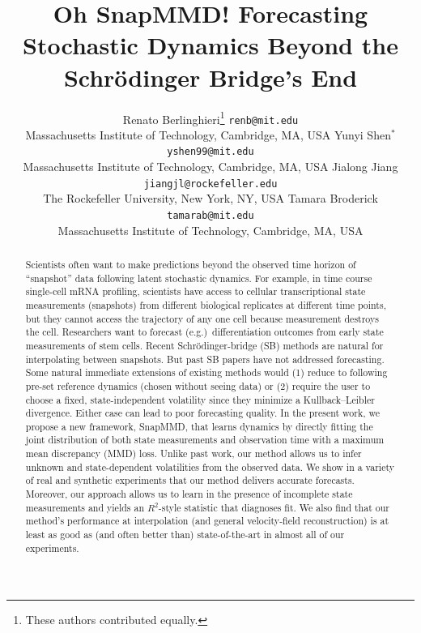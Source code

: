 \documentclass[twoside,11pt]{article}
\begin{document}
\title{Oh SnapMMD! Forecasting Stochastic Dynamics Beyond the Schr\"odinger Bridge's End}

\author{
  \name Renato Berlinghieri\thanks{These authors contributed equally.} \email \texttt{renb@mit.edu}\\
  \addr Massachusetts Institute of Technology, Cambridge, MA, USA
  \AND
  \name Yunyi Shen$^{*}$ \email \texttt{yshen99@mit.edu}\\
  \addr Massachusetts Institute of Technology, Cambridge, MA, USA
  \AND
  \name Jialong Jiang \email \texttt{jiangjl@rockefeller.edu}\\
  \addr The Rockefeller University, New York, NY, USA
  \AND
  \name Tamara Broderick \email \texttt{tamarab@mit.edu}\\
  \addr Massachusetts Institute of Technology, Cambridge, MA, USA
}

\editor{}

\maketitle

\begin{abstract}%
Scientists often want to make predictions beyond the observed time horizon of “snapshot” data following latent stochastic dynamics. For example, in time course single-cell mRNA profiling, scientists have access to cellular transcriptional state measurements (snapshots) from different biological replicates at different time points, but they cannot access the trajectory of any one cell because  measurement destroys the cell. Researchers want to forecast (e.g.)\ differentiation outcomes from early state measurements of stem cells. Recent Schrödinger-bridge (SB) methods are natural for interpolating between snapshots. But past SB papers have not addressed forecasting. Some natural immediate extensions of existing methods would (1) reduce to following pre-set reference dynamics (chosen without seeing data) or (2) require the user to choose a fixed, state-independent volatility since they minimize a Kullback–Leibler divergence. Either case can lead to poor forecasting quality. In the present work, we propose a new framework, SnapMMD, that learns dynamics by directly fitting the joint distribution of both state measurements and observation time with a maximum mean discrepancy (MMD) loss. Unlike past work, our method allows us to infer unknown and state-dependent volatilities from the observed data. We show in a variety of real and synthetic experiments that our method delivers accurate forecasts. Moreover, our approach allows us to learn in the presence of incomplete state measurements and yields an $R^2$-style statistic that diagnoses fit. We also find that our method's performance at interpolation (and general velocity-field reconstruction) is at least as good as (and often better than) state-of-the-art in almost all of our experiments. 
\end{abstract}
\end{document}
